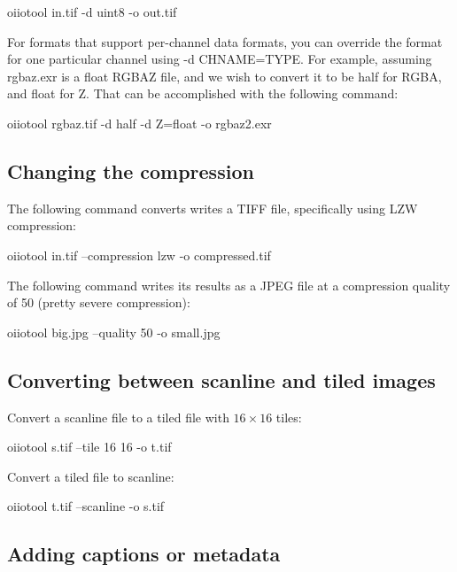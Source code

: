 \begin{code}
    oiiotool in.tif -d uint8 -o out.tif
\end{code}

For formats that support per-channel data formats, you can override
the format for one particular channel using {\cf -d CHNAME=TYPE}.
For example, assuming {\cf rgbaz.exr} is a {\cf float} RGBAZ file,
and we wish to convert it to be {\cf half} for RGBA, and {\cf float}
for Z.  That can be accomplished with the following command:

\begin{code}
    oiiotool rgbaz.tif -d half -d Z=float -o rgbaz2.exr
\end{code}


\subsection*{Changing the compression}

The following command converts writes a TIFF file, specifically using
LZW compression:

\begin{code}
    oiiotool in.tif --compression lzw -o compressed.tif
\end{code}

The following command writes its results as a JPEG file at a 
compression quality of 50 (pretty severe compression):

\begin{code}
    oiiotool big.jpg --quality 50 -o small.jpg
\end{code}



\subsection*{Converting between scanline and tiled images}

Convert a scanline file to a tiled file with $16 \times 16$ tiles:

\begin{code}
    oiiotool s.tif --tile 16 16 -o t.tif
\end{code}

\noindent Convert a tiled file to scanline:

\begin{code}
    oiiotool t.tif --scanline -o s.tif
\end{code}



\subsection*{Adding captions or metadata}

